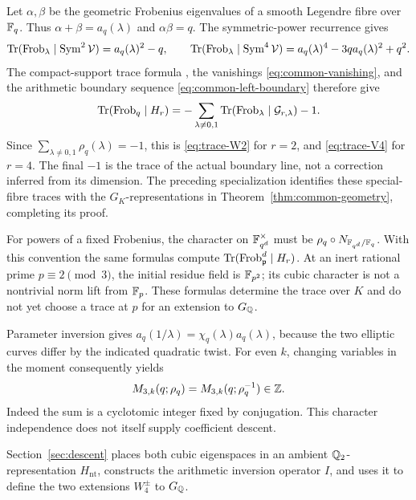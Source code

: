 Let \(\alpha,\beta\) be the geometric Frobenius eigenvalues of a
smooth Legendre fibre over \(\mathbb F_q\). Thus
\(\alpha+\beta=a_q(\lambda)\) and \(\alpha\beta=q\). The
symmetric-power recurrence gives
\[
 \operatorname{Tr}(\operatorname{Frob}_\lambda\mid\operatorname{Sym}^2\mathcal V)
      =a_q(\lambda)^2-q,
 \qquad
 \operatorname{Tr}(\operatorname{Frob}_\lambda\mid\operatorname{Sym}^4\mathcal V)
      =a_q(\lambda)^4-3qa_q(\lambda)^2+q^2.
\]
The compact-support trace formula \cite{StacksTrace}, the vanishings
\eqref{eq:common-vanishing}, and the arithmetic boundary sequence
\eqref{eq:common-left-boundary} therefore give
\[
 \operatorname{Tr}(\operatorname{Frob}_q\mid H_r)
   =-\sum_{\lambda\ne0,1}
          \operatorname{Tr}(\operatorname{Frob}_\lambda\mid\mathcal G_{r,\lambda})-1.
\]
Since \(\sum_{\lambda\ne0,1}\rho_q(\lambda)=-1\), this is
\eqref{eq:trace-W2} for \(r=2\), and \eqref{eq:trace-V4} for
\(r=4\). The final \(-1\) is the trace of the actual boundary
line, not a correction inferred from its dimension. The preceding
specialization identifies these special-fibre traces with the
\(G_K\)-representations in Theorem~\ref{thm:common-geometry}, completing
its proof.

For powers of a fixed Frobenius, the character on \(\mathbb F_{q^d}^\times\)
must be \(\rho_q\circ N_{\mathbb F_{q^d}/\mathbb F_q}\). With this convention the
same formulas compute \(\operatorname{Tr}(\operatorname{Frob}_{\mathfrak p}^{d}\mid H_r)\).
At an inert rational prime \(p\equiv2\pmod3\), the initial residue
field is \(\mathbb F_{p^2}\); its cubic character is not a nontrivial norm
lift from \(\mathbb F_p\). These formulas determine the trace over \(K\)
and do not yet choose a trace at \(p\) for an extension to \(G_\mathbb Q\).

Parameter inversion gives
\(a_q(1/\lambda)=\chi_q(\lambda)a_q(\lambda)\), because the two
elliptic curves differ by the indicated quadratic twist. For even
\(k\), changing variables in the moment consequently yields
\[
 M_{3,k}(q;\rho_q)=M_{3,k}(q;\rho_q^{-1})\in\mathbb Z.
\]
Indeed the sum is a cyclotomic integer fixed by conjugation. This
character independence does not itself supply coefficient descent.

Section~\ref{sec:descent} places both cubic eigenspaces in an ambient
\(\mathbb Q_2\)-representation \(H_{\mathrm{nt}}\), constructs the
arithmetic inversion operator \(I\), and uses it to define the two
extensions \(W_4^\pm\) to \(G_\mathbb Q\).
